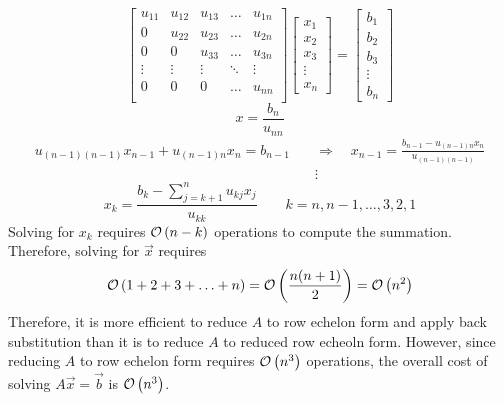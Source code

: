 \begin{equation*}
    \begin{bmatrix}  
        u_{11} & u_{12} & u_{13} & \ldots & u_{1n} \\
        0      & u_{22} & u_{23} & \ldots & u_{2n} \\
        0      & 0      & u_{33} & \ldots & u_{3n} \\
        \vdots & \vdots & \vdots & \ddots & \vdots \\
        0      & 0      & 0      & \ldots & u_{nn} \\
    \end{bmatrix}  
    \begin{bmatrix}x_1\\x_2\\x_3\\\vdots\\x_n\end{bmatrix}=
    \begin{bmatrix}b_1\\b_2\\b_3\\\vdots\\b_n\end{bmatrix}
\end{equation*}
%
\begin{equation*}
  x = \frac{b_n}{u_{nn}}
\end{equation*}
%  
\begin{align*}
  u_{(n-1)(n-1)} x_{n-1} + u_{(n-1)n} x_n = b_{n-1} \quad &\Rightarrow \quad
  x_{n-1} = \frac{b_{n-1}-u_{(n-1)n}x_n}{u_{(n-1)(n-1)}}\\&\vdots
\end{align*}
%
\begin{equation*}
  x_k  = \frac{b_k - \sum_{j=k+1}^n u_{kj}x_j}{u_{kk}} \qquad k=n, n-1, \ldots, 3, 2, 1
\end{equation*}
%
Solving for $x_k$ requires $\mathcal{O}\left(n-k\right)$ operations to compute the summation. 
Therefore, solving for $\Vec{x}$ requires
%
\begin{equation*}
	\mathcal{O}\left(1+2+3+\ldots+n\right) = \mathcal{O}\left(\frac{n(n+1)}{2}\right) = \mathcal{O}\left(n^2\right)
\end{equation*}
%
Therefore, it is more efficient to reduce $A$ to row echelon form and apply back
substitution than it is to reduce $A$ to reduced row echeoln form. However,
since reducing $A$ to row echelon form requires $\mathcal{O}\left(n^3\right)$ operations, the
overall cost of solving $A\Vec{x}=\Vec{b}$ is $\mathcal{O}\left(n^3\right)$.

